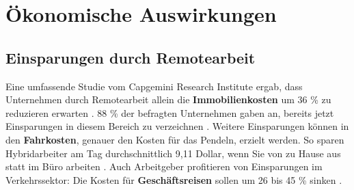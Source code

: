 \documentclass[runningheads]{llncs}
\begin{document}





\section{Ökonomische Auswirkungen}


\subsection{Einsparungen durch Remotearbeit}

Eine umfassende Studie vom Capgemini Research Institute ergab, dass Unternehmen durch Remotearbeit allein die \textbf{Immobilienkosten} um 36 \% zu reduzieren erwarten \cite{capgemini_research_institute_future_2020}.
88 \% der befragten Unternehmen gaben an, bereits jetzt Einsparungen in diesem Bereich zu verzeichnen \cite{capgemini_research_institute_future_2020}.
Weitere Einsparungen können in den \textbf{Fahrkosten}, genauer den Kosten für das Pendeln, erzielt werden.
So sparen Hybridarbeiter am Tag durchschnittlich 9,11 Dollar, wenn Sie von zu Hause aus statt im Büro arbeiten \cite{owl_labs_state_2022}.
Auch Arbeitgeber profitieren von Einsparungen im Verkehrssektor:
Die Kosten für \textbf{Geschäftsreisen} sollen um 26 bis 45 \% sinken \cite{capgemini_research_institute_future_2020}.
\end{document}
